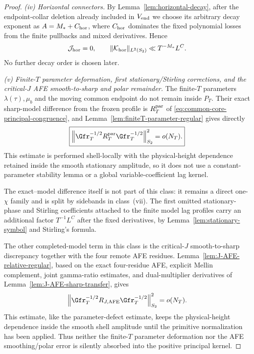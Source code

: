 \begin{proof}
\emph{(iv) Horizontal connectors.}
By Lemma~\ref{lem:horizontal-decay}, after the endpoint-collar deletion already
included in $V_{\rm end}$ we choose its arbitrary decay exponent as
$A=M_*+C_{\rm hor}$, where $C_{\rm hor}$ dominates the fixed polynomial losses
from the finite pullbacks and mixed derivatives. Hence
\[
\mathcal J_{\rm hor}=0,
\qquad
\|\mathcal K_{\rm hor}\|_{L^2(S_2)}\ll T^{-M_*}L^C.
\]
No further decay order is chosen later.

\emph{(v) Finite-$T$ parameter deformation, first stationary/Stirling
corrections, and the critical-$J$ AFE smooth-to-sharp and polar remainder.}
The finite-$T$ parameters $\lambda(\tau),\mu_b$ and the moving common endpoint
do not remain inside $P_T$.  Their exact sharp-model difference from the frozen
profile is $R_T^{\rm par}$ of \eqref{eq:common-core-principal-congruence}, and
Lemma~\ref{lem:finiteT-parameter-regular} gives directly
\begin{equation}
\boxed{
\left\|\Gfr_T^{-1/2}R_T^{\rm par}\Gfr_T^{-1/2}\right\|_{S_2}^2=o(N_T).
}
\label{eq:finiteT-parameter-ledger}
\end{equation}
This estimate is performed shell-locally with the physical-height dependence
retained inside the smooth stationary amplitude, so it does not use a
constant-parameter stability lemma or a global variable-coefficient lag
kernel.

The exact--model difference itself is not part of this class: it remains a
direct one-$\chi$ family and is split by sidebands in class~(vii).  The first
omitted stationary-phase and Stirling coefficients attached to the finite model
lag profiles carry an additional factor $T^{-1}L^C$ after the fixed derivatives,
by Lemma~\ref{lem:stationary-symbol} and Stirling's formula.

The other completed-model term in this class is the critical-$J$
smooth-to-sharp discrepancy together with the four remote AFE residues.
Lemma~\ref{lem:J-AFE-relative-regular}, based on
the exact four-residue AFE, explicit Mellin complement, joint gamma-ratio
estimates, and dual-multiplier derivatives of
Lemma~\ref{lem:J-AFE-sharp-transfer}, gives
\[
\left\|\Gfr_T^{-1/2}R_{J,\rm AFE}\Gfr_T^{-1/2}\right\|_{S_2}^2=o(N_T).
\]
This estimate, like the parameter-defect estimate, keeps the physical-height
dependence inside the smooth shell amplitude until the primitive normalization
has been applied.  Thus neither the finite-$T$ parameter deformation nor the
AFE smoothing/polar error is silently absorbed into the positive principal kernel.


\end{proof}
